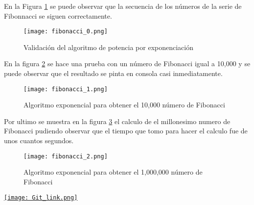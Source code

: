 \documentclass{article}
\begin{document}
\vspace{5mm} %

En la Figura \ref{fig:exponentiation} se puede observar que la secuencia de los números de la serie de Fibonnacci se siguen correctamente.

\vspace{5mm} %

\begin{figure}[ht]
    \centering
    \texttt{[image: fibonacci\_0.png]}
    \caption{Validación del algoritmo de potencia por exponenciación}
    \label{fig:exponentiation}
\end{figure}

\vspace{15mm} %

En la figura \ref{fig:fibo10k} se hace una prueba con un número de Fibonacci igual a 10,000 y se puede observar que el resultado se pinta en consola casi inmediatamente.

\vspace{5mm} %

\begin{figure}[ht]
    \centering
    \texttt{[image: fibonacci\_1.png]}
    \caption{Algoritmo exponencial para obtener el 10,000 número de Fibonacci}
    \label{fig:fibo10k}
\end{figure}

\vspace{5mm} %

Por ultimo se muestra en la figura \ref{fig:fibo1M} el calculo de el millonesimo numero de Fibonacci pudiendo observar que el tiempo que tomo para hacer el calculo fue de unos cuantos segundos.

\newpage

\begin{figure}
    \centering
    \texttt{[image: fibonacci\_2.png]}
    \caption{Algoritmo exponencial para obtener el 1,000,000 número de Fibonacci}
    \label{fig:fibo1M}
\end{figure}

\vspace{15mm} %

\href{https://github.com/enganthony18/Algorithms}{\texttt{[image: Git\_link.png]}}
\end{document}
